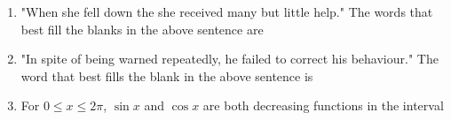 \documentclass[journal]{IEEEtran}
\begin{document}
\begin{enumerate}
    \item "When she fell down the \underline{\hspace{2cm}} she received many \underline{\hspace{2cm}} but little help." 
    The words that best fill the blanks in the above sentence are
    
    \hfill{}
    \begin{enumerate}
    \end{enumerate}

    \item "In spite of being warned repeatedly, he failed to correct his \underline{\hspace{2cm}} behaviour."
    The word that best fills the blank in the above sentence is
    
    \hfill{}
    \begin{enumerate}
    \end{enumerate}

    \item For $0 \le x \le 2\pi$, $\sin x$ and $\cos x$ are both decreasing functions in the interval
    
    \hfill{}
    \begin{enumerate}
    \end{enumerate}


\end{enumerate}
\end{document}
